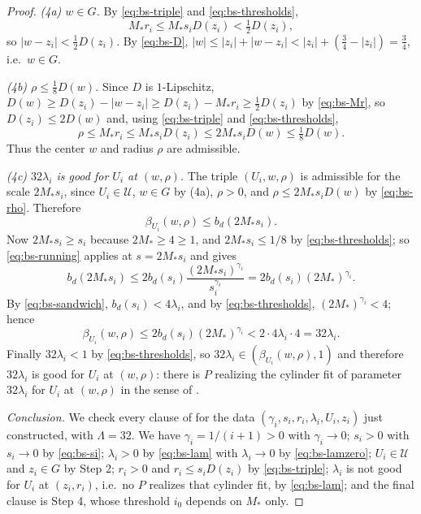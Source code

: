 \begin{proof}
\emph{(4a) $w\in G$.} By \eqref{eq:bs-triple} and \eqref{eq:bs-thresholds},
\begin{equation}\label{eq:bs-Mr}
  M_*r_i\le M_*s_iD(z_i)<\tfrac12D(z_i),
\end{equation}
so $|w-z_i|<\tfrac12D(z_i)$. By \eqref{eq:bs-D}, $|w|\le|z_i|+|w-z_i|
<|z_i|+(\tfrac34-|z_i|)=\tfrac34$, i.e.\ $w\in G$.

\emph{(4b) $\rho\le\tfrac18D(w)$.} Since $D$ is $1$-Lipschitz,
$D(w)\ge D(z_i)-|w-z_i|\ge D(z_i)-M_*r_i\ge\tfrac12D(z_i)$ by
\eqref{eq:bs-Mr}, so $D(z_i)\le2D(w)$ and, using \eqref{eq:bs-triple} and
\eqref{eq:bs-thresholds},
\begin{equation}\label{eq:bs-rho}
  \rho\le M_*r_i\le M_*s_iD(z_i)\le2M_*s_iD(w)\le\tfrac18D(w).
\end{equation}
Thus the center $w$ and radius $\rho$ are admissible.

\emph{(4c) $32\lambda_i$ is good for $U_i$ at $(w,\rho)$.} The triple
$(U_i,w,\rho)$ is admissible for the scale $2M_*s_i$, since $U_i\in\mathcal U$,
$w\in G$ by (4a), $\rho>0$, and $\rho\le2M_*s_iD(w)$ by \eqref{eq:bs-rho}.
Therefore
\[
  \beta_{U_i}(w,\rho)\le b_d(2M_*s_i).
\]
Now $2M_*s_i\ge s_i$ because $2M_*\ge4\ge1$, and $2M_*s_i\le1/8$ by
\eqref{eq:bs-thresholds}; so \eqref{eq:bs-running} applies at $s=2M_*s_i$ and
gives
\[
  b_d(2M_*s_i)\le2b_d(s_i)\frac{(2M_*s_i)^{\gamma_i}}{s_i^{\gamma_i}}
   =2b_d(s_i)(2M_*)^{\gamma_i}.
\]
By \eqref{eq:bs-sandwich}, $b_d(s_i)<4\lambda_i$, and by
\eqref{eq:bs-thresholds}, $(2M_*)^{\gamma_i}<4$; hence
\[
  \beta_{U_i}(w,\rho)\le2b_d(s_i)(2M_*)^{\gamma_i}
   <2\cdot4\lambda_i\cdot4=32\lambda_i .
\]
Finally $32\lambda_i<1$ by \eqref{eq:bs-thresholds}, so
$32\lambda_i\in(\beta_{U_i}(w,\rho),1)$ and therefore $32\lambda_i$ is good for
$U_i$ at $(w,\rho)$: there is $P$ realizing the cylinder fit of parameter
$32\lambda_i$ for $U_i$ at $(w,\rho)$ in the sense of .

\emph{Conclusion.}
We check every clause of  for the data
$(\gamma_i,s_i,r_i,\lambda_i,U_i,z_i)$ just constructed, with $\Lambda=32$.
We have $\gamma_i=1/(i+1)>0$ with $\gamma_i\to0$; $s_i>0$ with $s_i\to0$ by
\eqref{eq:bs-si}; $\lambda_i>0$ by \eqref{eq:bs-lam} with $\lambda_i\to0$ by
\eqref{eq:bs-lamzero}; $U_i\in\mathcal U$ and $z_i\in G$ by Step 2; $r_i>0$ and
$r_i\le s_iD(z_i)$ by \eqref{eq:bs-triple}; $\lambda_i$ is not good for $U_i$ at
$(z_i,r_i)$, i.e.\ no $P$ realizes that cylinder fit, by \eqref{eq:bs-lam}; and
the final clause is Step 4, whose threshold $i_0$ depends on $M_*$ only.
\end{proof}
